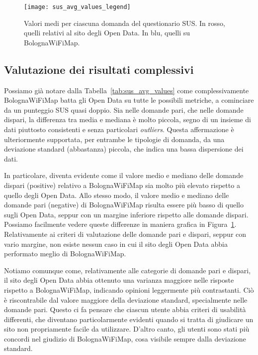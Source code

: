 \begin{figure}[H]
    \centering
    \texttt{[image: sus\_avg\_values\_legend]}
    \caption[Valori medi per ciascuna domanda del questionario SUS]{Valori medi per ciascuna domanda del questionario SUS. In rosso, quelli relativi al sito degli Open Data. In blu, quelli su BolognaWiFiMap.}
    \label{fig:sus_avg_values}
\end{figure}

\subsection{Valutazione dei risultati complessivi}
Possiamo già notare dalla Tabella~\ref{tab:sus_avg_values} come complessivamente BolognaWiFiMap batta gli Open Data su tutte le possibili metriche, a cominciare da un punteggio SUS quasi doppio. Sia nelle domande pari, che nelle domande dispari, la differenza tra media e mediana è molto piccola, segno di un insieme di dati piuttosto consistenti e senza particolari \textit{outliers}. Questa affermazione è ulteriormente supportata, per entrambe le tipologie di domanda, da una deviazione standard (abbastanza) piccola, che indica una bassa dispersione dei dati.

In particolare, diventa evidente come il valore medio e mediano delle domande dispari (positive) relativo a BolognaWiFiMap sia molto più elevato rispetto a quello degli Open Data. Allo stesso modo, il valore medio e mediano delle domande pari (negative) di BolognaWiFiMap risulta essere più basso di quello sugli Open Data, seppur con un margine inferiore rispetto alle domande dispari. Possiamo facilmente vedere queste differenze in maniera grafica in Figura~\ref{fig:sus_avg_values}. Relativamente ai criteri di valutazione delle domande pari e dispari, seppur con vario margine, non esiste nessun caso in cui il sito degli Open Data abbia performato meglio di BolognaWiFiMap.

Notiamo comunque come, relativamente alle categorie di domande pari e dispari, il sito degli Open Data abbia ottenuto una varianza maggiore nelle risposte rispetto a BolognaWiFiMap, indicando opinioni leggermente più contrastanti. Ciò è riscontrabile dal valore maggiore della deviazione standard, specialmente nelle domande pari. Questo ci fa pensare che ciascun utente abbia criteri di usabilità differenti, che diventano particolarmente evidenti quando si tratta di giudicare un sito non propriamente facile da utilizzare. D'altro canto, gli utenti sono stati più concordi nel giudizio di BolognaWiFiMap, cosa visibile sempre dalla deviazione standard.

